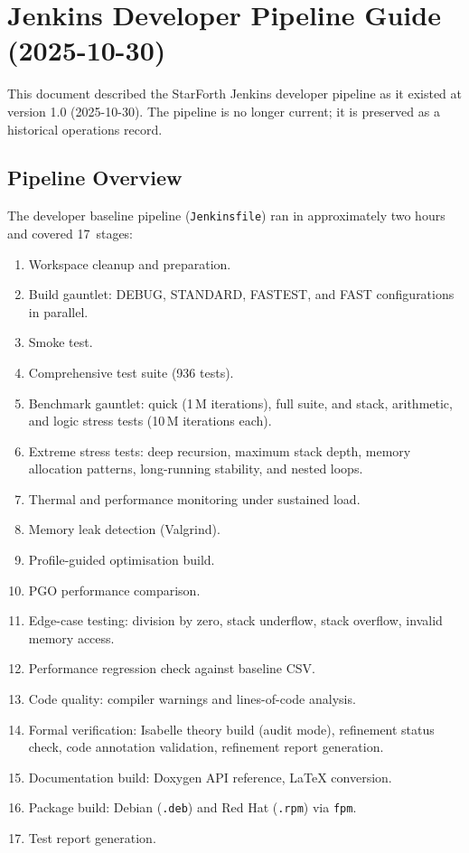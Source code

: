 
\section{Jenkins Developer Pipeline Guide (2025-10-30)}

This document described the StarForth Jenkins developer pipeline as it existed at
version 1.0 (2025-10-30). The pipeline is no longer current; it is preserved as a
historical operations record.

\subsection{Pipeline Overview}

The developer baseline pipeline (\texttt{Jenkinsfile}) ran in approximately two hours
and covered 17~stages:

\begin{enumerate}
  \item Workspace cleanup and preparation.
  \item Build gauntlet: DEBUG, STANDARD, FASTEST, and FAST configurations in parallel.
  \item Smoke test.
  \item Comprehensive test suite (936 tests).
  \item Benchmark gauntlet: quick (1\,M iterations), full suite, and stack, arithmetic,
        and logic stress tests (10\,M iterations each).
  \item Extreme stress tests: deep recursion, maximum stack depth, memory allocation
        patterns, long-running stability, and nested loops.
  \item Thermal and performance monitoring under sustained load.
  \item Memory leak detection (Valgrind).
  \item Profile-guided optimisation build.
  \item PGO performance comparison.
  \item Edge-case testing: division by zero, stack underflow, stack overflow, invalid
        memory access.
  \item Performance regression check against baseline CSV.
  \item Code quality: compiler warnings and lines-of-code analysis.
  \item Formal verification: Isabelle theory build (audit mode), refinement status
        check, code annotation validation, refinement report generation.
  \item Documentation build: Doxygen API reference, \LaTeX{} conversion.
  \item Package build: Debian (\texttt{.deb}) and Red Hat (\texttt{.rpm}) via
        \texttt{fpm}.
  \item Test report generation.
\end{enumerate}

